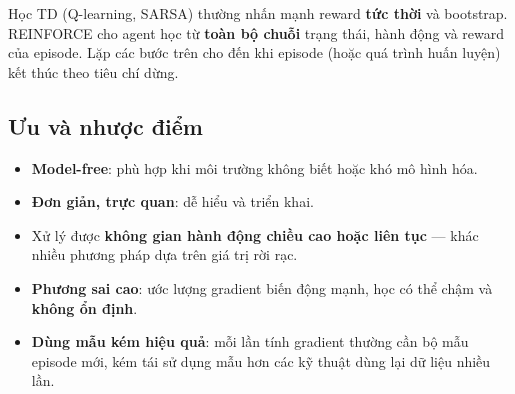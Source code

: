 \begin{luuy}[title={So với TD (Q-learning, SARSA)}]
Học TD (Q-learning, SARSA) thường nhấn mạnh reward \textbf{tức thời} và bootstrap.
REINFORCE cho agent học từ \textbf{toàn bộ chuỗi} trạng thái, hành động và reward của episode.
Lặp các bước trên cho đến khi episode (hoặc quá trình huấn luyện) kết thúc theo tiêu chí dừng.
\end{luuy}

\subsection{Ưu và nhược điểm}

\begin{tinhchat}[title={Ưu điểm REINFORCE}]
\begin{itemize}
  \item \textbf{Model-free}: phù hợp khi môi trường không biết hoặc khó mô hình hóa.
  \item \textbf{Đơn giản, trực quan}: dễ hiểu và triển khai.
  \item Xử lý được \textbf{không gian hành động chiều cao hoặc liên tục} --- khác nhiều phương pháp dựa trên giá trị rời rạc.
\end{itemize}
\end{tinhchat}

\begin{luuy}[title={Nhược điểm REINFORCE}]
\begin{itemize}
  \item \textbf{Phương sai cao}: ước lượng gradient biến động mạnh, học có thể chậm và \textbf{không ổn định}.
  \item \textbf{Dùng mẫu kém hiệu quả}: mỗi lần tính gradient thường cần bộ mẫu episode mới, kém tái sử dụng mẫu hơn các kỹ thuật dùng lại dữ liệu nhiều lần.
\end{itemize}
\end{luuy}
